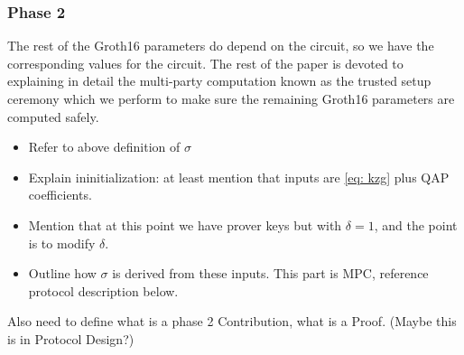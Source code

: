 \subsubsection{Phase 2}
The rest of the Groth16 parameters do depend on the circuit, so we have the corresponding values for the \MantaPay{} circuit. The rest of the paper is devoted to explaining in detail the multi-party computation known as the trusted setup ceremony which we perform to make sure the remaining Groth16 parameters are computed safely.

\begin{itemize}
    \item Refer to above definition of $\sigma$
    \item Explain ininitialization: at least mention that inputs are \eqref{eq: kzg} plus QAP coefficients. 
    \item Mention that at this point we have prover keys but with $\delta = 1$, and the point is to modify $\delta$.
    \item Outline how $\sigma$ is derived from these inputs. This part is MPC, reference protocol description below.
\end{itemize}

Also need to define what is a phase 2 Contribution, what is a Proof. (Maybe this is in Protocol Design?)